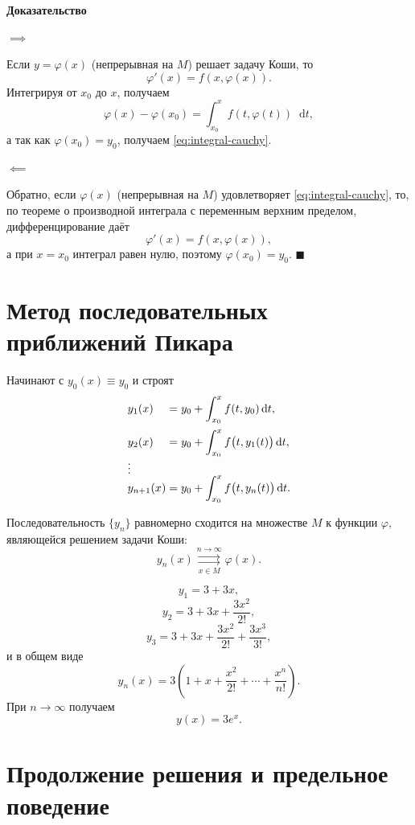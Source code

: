 \documentclass[12pt,a4paper]{article}
\numberwithin{equation}{section}
\newcommand{\dd}{\mathop{}\!\mathrm{d}}
\renewenvironment{proof}[1][Доказательство]{\begin{center}\textbf{#1}\end{center}}{\hfill$\blacksquare$\par}
\DeclareRobustCommand{\examtag}[1]{\space{\normalfont\small\color{HSEgray}(#1)}}
\begin{document}
\begin{proof}
\(\boxed{\implies}\)

Если $y=\varphi(x)$ (непрерывная на \(M\)) решает задачу Коши, то
\[
\varphi'(x)=f(x,\varphi(x)).
\]
Интегрируя от $x_0$ до $x$, получаем
\[
\varphi(x)-\varphi(x_0)=\int_{x_0}^{x}f(t,\varphi(t))\dd t,
\]
а так как $\varphi(x_0)=y_0$, получаем \eqref{eq:integral-cauchy}.

\(\boxed{\impliedby}\)

Обратно, если $\varphi(x)$ (непрерывная на \(M\)) удовлетворяет \eqref{eq:integral-cauchy}, то, по теореме о производной интеграла с переменным верхним
пределом, дифференцирование даёт
\[
\varphi'(x)=f(x,\varphi(x)),
\]
а при $x=x_0$ интеграл равен нулю, поэтому $\varphi(x_0)=y_0$.
\end{proof}

\section[Метод Пикара\examtag{вопрос~5}]{Метод последовательных приближений Пикара\examtag{вопрос~5}}

\begin{definitionHSE}
Начинают с $y_0(x)\equiv y_0$ и строят
\[
\begin{array}{l@{\;}l}
y_1(x)     &= y_0+\displaystyle\int_{x_0}^{x} f(t,y_0)\dd t,\\[12pt]
y_2(x)     &= y_0+\displaystyle\int_{x_0}^{x} f\bigl(t,y_1(t)\bigr)\dd t,\\
\vdots     &\\[-2pt]
y_{n+1}(x) &= y_0+\displaystyle\int_{x_0}^{x} f\bigl(t,y_n(t)\bigr)\dd t.
\end{array}
\]
\end{definitionHSE}
Последовательность \(\{y_n\}\) равномерно сходится на множестве \(M\) к функции \(\varphi\), являющейся решением задачи Коши:
\[
y_n(x)\underset{x\in M}{\overset{n\to\infty}{\rightrightarrows}}\varphi(x).
\]
\begin{exampleHSE}[Задача $y'=y$, $y(0)=3$]
\[
y_1=3+3x,
\]
\[
y_2=3+3x+\frac{3x^2}{2!},
\]
\[
y_3=3+3x+\frac{3x^2}{2!}+\frac{3x^3}{3!},
\]
и в общем виде
\[
y_n(x)=3\left(1+x+\frac{x^2}{2!}+\cdots+\frac{x^n}{n!}\right).
\]
При $n\to\infty$ получаем
\[
y(x)=3e^x.
\]
\end{exampleHSE}

\section[Продолжение и предельное поведение решений\examtag{вопрос~8}]{Продолжение решения и предельное поведение\examtag{вопрос~8}}
\end{document}
